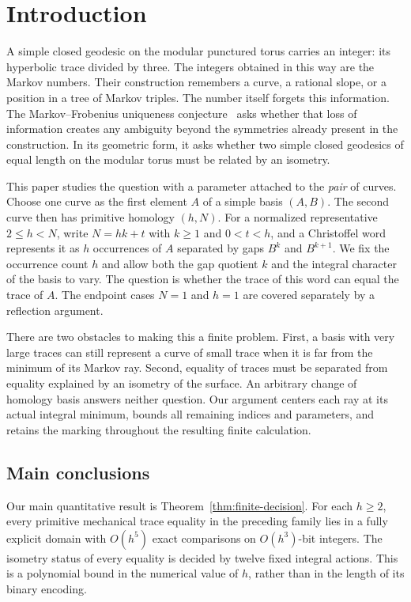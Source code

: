 \section{Introduction}

A simple closed geodesic on the modular punctured torus carries an
integer: its hyperbolic trace divided by three. The integers obtained
in this way are the Markov numbers. Their construction remembers a
curve, a rational slope, or a position in a tree of Markov triples.
The number itself forgets this information. The Markov--Frobenius
uniqueness conjecture~\cite{Frobenius1913} asks whether that loss of information creates
any ambiguity beyond the symmetries already present in the construction.
In its geometric form, it asks whether two simple closed geodesics of
equal length on the modular torus must be related by an isometry.

This paper studies the question with a parameter attached to the
\emph{pair} of curves. Choose one curve as the first element $A$ of a
simple basis $(A,B)$. The second curve then has primitive homology
$(h,N)$. For a normalized representative $2\leqslant h<N$, write $N=hk+t$ with
$k\geqslant1$ and $0<t<h$, and a Christoffel word represents it as
$h$ occurrences of $A$ separated by gaps $B^k$ and $B^{k+1}$.
We fix the occurrence count $h$ and allow both the gap quotient $k$
and the integral character of the basis to vary. The question is whether
the trace of this word can equal the trace of $A$. The endpoint cases
$N=1$ and $h=1$ are covered separately by a reflection argument.

There are two obstacles to making this a finite problem. First, a
basis with very large traces can still represent a curve of small trace
when it is far from the minimum of its Markov ray. Second, equality
of traces must be separated from equality explained by an isometry of
the surface. An arbitrary change of homology basis answers neither
question. Our argument centers each ray at its actual integral minimum,
bounds all remaining indices and parameters, and retains the marking
throughout the resulting finite calculation.

\subsection{Main conclusions}

Our main quantitative result is Theorem~\ref{thm:finite-decision}.
For each $h\geqslant2$, every primitive mechanical trace equality in
the preceding family lies in a fully explicit domain with $O(h^5)$
exact comparisons on $O(h^3)$-bit integers. The isometry status of
every equality is decided by twelve fixed integral actions. This is a
polynomial bound in the numerical value of $h$, rather than in the
length of its binary encoding.

